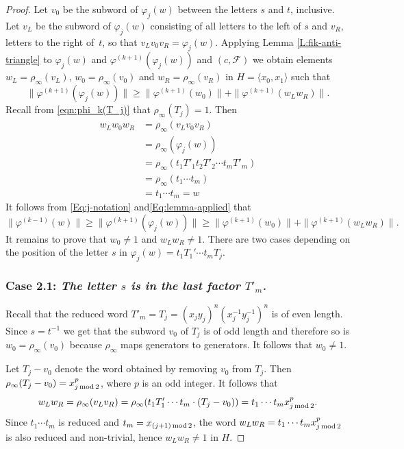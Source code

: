 \documentclass[12pt,reqno,a4paper]{article}
\theoremstyle{definition}
\theoremstyle{remark}
\numberwithin{equation}{section}
\numberwithin{figure}{section}
\newcommand{\C}[1]{{\mathscr #1}}
\begin{document}
\begin{proof}
Let $v_0$ be the subword of $\varphi_{j}(w)$ between the letters 
$s$ and $t$, inclusive.
Let $v_L$ be the subword of $\varphi_{j}(w)$ consisting of all letters to the left of
$s$ and $v_R$, letters to the right of~$t$, so that $v_Lv_0v_R=\varphi_{j}(w)$.
Applying Lemma \ref{L:fik-anti-triangle} to $\varphi_j(w)$ and $\varphi^{(k+1)}(\varphi_j(w))$
and $(c,\C F)$ we obtain elements $w_L=\rho_{\infty}(v_L)$, $w_0=\rho_{\infty}(v_0)$ and
$w_R=\rho_{\infty}(v_R)$ in $H = \langle x_0,x_1 \rangle$ such that
\begin{equation}
\|\varphi^{(k+1)}(\varphi_{j}(w))\|
\geq \|\varphi^{(k+1)}(w_0)\|+ \|\varphi^{(k+1)}(w_Lw_R)\|.
\label{Eq:lemma-applied}
\end{equation}
Recall from \eqref{eqn:phi_k(T_j)} that $\rho_{\infty}(T_j) = 1$.
Then
\begin{align*}
w_Lw_0w_R &= \rho_{\infty}(v_Lv_0v_R)\\ 
&= \rho_{\infty}(\varphi_{j}(w))\\
&=\rho_{\infty}(t_1 T'_1 t_2 T'_2\cdots t_mT'_{m})\\
&=\rho_{\infty}(t_1\cdots t_m)\\
&=t_1\cdots t_m=w
\end{align*}
It follows from
\eqref{Eq:j-notation} and\eqref{Eq:lemma-applied} that
$$
\|\varphi^{(k-1)}(w)\| \geq
\|\varphi^{(k+1)}(\varphi_{j}(w))\|
\geq \|\varphi^{(k+1)}(w_0)\|+ \|\varphi^{(k+1)}(w_Lw_R)\|.
$$
It remains to prove that $w_0\neq 1$ and $w_Lw_R\neq 1$.
There are two cases depending on the position of the letter $s$ in
$\varphi_{j}(w) = t_1T_1' \cdots t_mT_j$.

\subsubsection*{Case 2.1: {\it The letter $s$ is in the last factor $T'_m$.}}

Recall that the reduced word $T'_m=T_j = (x_jy_j)^n(x_j^{-1}y_j^{-1})^n$
is of even length. Since $s=t^{-1}$ we
get that the subword $v_0$ of $T_j$ is of odd length and therefore so is 
$w_0=\rho_{\infty}(v_0)$ because $\rho_{\infty}$ maps generators to 
generators. 
It follows that $w_0 \neq 1$.

Let $T_j- v_0$ denote the word obtained by removing $v_0$ from $T_j$.
Then
$\rho_{\infty}(T_j- v_0) = x_{j\,{\rm mod}\,2}^p$, where $p$ is an odd integer. 
It follows that
$$
w_Lw_R = \rho_{\infty}(v_Lv_R) = \rho_{\infty}(t_1T_1'\cdots t_m \cdot (T_j-v_0))
=t_1\cdots t_m x_{j\,{\rm mod}\,2}^p.
$$
Since $t_1\cdots t_m$ is reduced and $t_m=x_{(j+1)\,{\rm mod}\,2}$, the word 
$w_Lw_R=t_1\cdots t_m x_{j\,{\rm mod}\,2}^p$ is also reduced and non-trivial,
hence $w_Lw_R\neq 1$ in $H$.


\end{proof}
\end{document}
